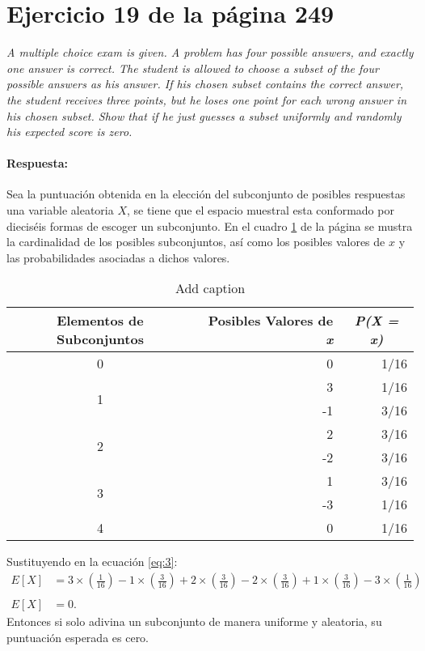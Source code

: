 \documentclass{article}
\begin{document}
\section{Ejercicio 19 de la página 249}  
\emph{A multiple choice exam is given. A problem has four possible answers, and exactly one answer is correct. The student is allowed to choose a subset of the four possible answers as his answer. If his chosen subset contains the correct answer, the student receives three points, but he loses one point for each wrong answer in his chosen subset. Show that if he just guesses a subset uniformly and randomly his expected score is zero.}

\paragraph{Respuesta:} Sea la puntuación obtenida en la elección del subconjunto de posibles respuestas una variable aleatoria $X$, se tiene que el espacio muestral esta conformado por dieciséis formas de escoger un subconjunto.  En el cuadro \ref{tab:6} de la página \pageref{tab:6} se mustra la cardinalidad de los posibles subconjuntos, así como los posibles valores de $x$ y las probabilidades asociadas a dichos valores.
\begin{table}[H]
  \centering
  \caption{Add caption}
    \begin{tabular}{crr}
    \toprule
    \multicolumn{1}{p{7em}}{\textbf{Elementos de Subconjuntos}} & \multicolumn{1}{p{5.39em}}{\textbf{Posibles Valores de \textit{\textbf{x}}}} & \multicolumn{1}{c}{\textit{\textbf{P(X = x)}}} \\
    \midrule
    0     & 0     & 1/16 \\
    \midrule
    \multirow{2}[2]{*}{1} & 3     & 1/16 \\
          & -1    & 3/16 \\
    \midrule
    \multirow{2}[2]{*}{2} & 2     & 3/16 \\
          & -2    & 3/16 \\
    \midrule
    \multirow{2}[2]{*}{3} & 1     & 3/16 \\
          & -3    & 1/16 \\
    \midrule
    4     & 0     & 1/16 \\
    \bottomrule
    \end{tabular}%
  \label{tab:6}%
\end{table}%

Sustituyendo en la ecuación \ref{eq:3}:
\begin{equation}
\begin{array}{ll}
   E[X] &= 3\times \left(\frac{1}{16}\right) - 1\times \left(\frac{3}{16}\right)+ 2\times \left(\frac{3}{16}\right)- 2\times \left(\frac{3}{16}\right)+ 1\times \left(\frac{3}{16}\right)- 3\times \left(\frac{1}{16}\right) \\
   &\\
   E[X] & = 0. 
  
   \end{array}
   \end{equation}
    Entonces si solo adivina un subconjunto de manera uniforme y aleatoria, su puntuación esperada es cero.
\end{document}
